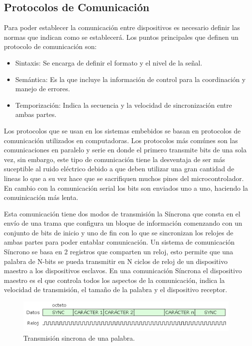 \documentclass[letterpaper,12pt,oneside]{book}
\begin{document}
			\subsection{Protocolos de Comunicación}
			Para poder establecer la comunicación entre dispositivos es necesario definir las normas que indican como se establecerá. Los puntos principales que definen un protocolo de comunicación son:

			\begin{itemize}
				\item Sintaxis: Se encarga de definir el formato y el nivel de la señal.

				\item Semántica: Es la que incluye la información de control para la coordinación y manejo de errores.

				\item Temporización: Indica la secuencia y la velocidad de sincronización entre ambas partes.
			\end{itemize}

			Los protocolos que se usan en los sistemas embebidos se basan en protocolos de comunicación utilizados en computadoras. Los protocolos más comúnes son las comunicaciones en paralelo y serie en donde el primero transmite bits de una sola vez, sin embargo, este tipo de comunicación tiene la desventaja de ser más suceptible al ruido eléctrico debido a que deben utilizar una gran cantidad de lineas lo que a su vez hace que se sacrifiquen muchos pines del microcontrolador. En cambio con la comunicación serial los bits son enviados uno a uno, haciendo la comuinicación más lenta.

			Esta comunicación tiene dos modos de transmisión la Síncrona que consta en el envío de una trama que configura un bloque de información comenzando con un conjunto de bits de inicio y uno de fin con lo que se sincronizan los relojes de ambas partes para poder entablar comunicación. Un sistema de comunicación Síncrono se basa en 2 registros que comparten un reloj, esto permite que una palabra de N-bits se pueda transmitir en N ciclos de reloj de un dispositivo maestro a los dispositivos esclavos. En una comunicación Síncrona el dispositivo maestro es el que controla todos los aspectos de la comunicación, indica la velocidad de transmisión, el tamaño de la palabra y el dispositivo receptor\cite{moyanoclase}.

			\begin{figure}[!htpb]
				\centering
				\includegraphics[scale = 0.7]{Material de Consulta/SincCom.PNG}
				\caption[Comunicación Síncrona]{Transmisión sincrona de una palabra\cite{perez2016protocolos}.}
				\label{SincCom}
			\end{figure}
			
\end{document}
